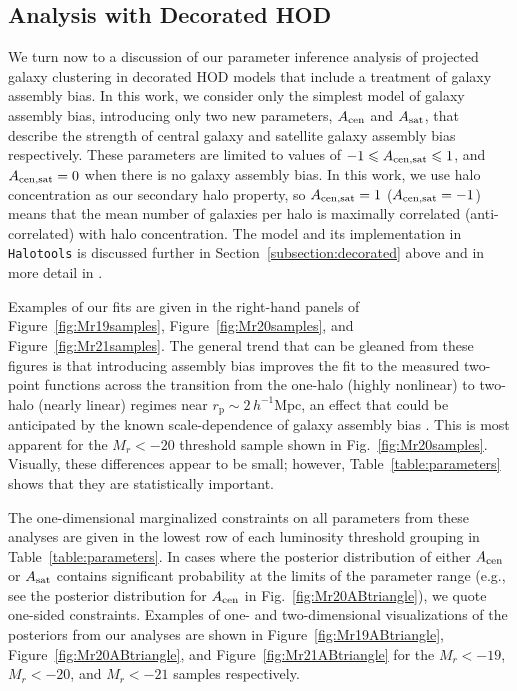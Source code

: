 \documentclass[usenatbib,usegraphicx,letterpaper]{mn2e}
\newcommand{\rp}{r_{\mathrm{p}}}
\begin{document}
\subsection{Analysis with Decorated HOD}
\label{subsection:ab}


We turn now to a discussion of our parameter inference analysis of projected galaxy clustering
in decorated HOD models that include a treatment of galaxy assembly bias. In this work,
we consider only the simplest model of galaxy assembly bias, introducing only two new
parameters, $A_{\rm cen}$ and $A_{\rm sat}$, that describe the strength of central galaxy
and satellite galaxy assembly bias respectively. These parameters are limited to values
of $-1 \le A_{\rm cen,sat} \le 1$, and $A_{\rm cen,sat}=0$ when there is no galaxy assembly bias.
In this work, we use halo concentration as our secondary halo property, so $A_{\rm cen,sat}=1$
($A_{\rm cen,sat}=-1$) means that the mean number of galaxies per halo is maximally
correlated (anti-correlated) with halo concentration. The model and its implementation
in {\tt Halotools} is discussed further in Section~\ref{subsection:decorated} above 
and in more detail in \citet{hearin_etal16}.


Examples of our fits are given in the right-hand panels of Figure~\ref{fig:Mr19samples},
Figure~\ref{fig:Mr20samples}, and Figure~\ref{fig:Mr21samples}. The general trend that
can be gleaned from these figures is that introducing assembly bias improves the fit to
the measured two-point functions across the
transition from the one-halo (highly nonlinear) to two-halo (nearly linear) regimes near 
$\rp \sim 2\, h^{-1}{\mathrm{Mpc}}$, an effect that could be anticipated by the known 
scale-dependence of galaxy assembly bias \citep{sunayama_etal16}. 
This is most apparent for the $M_r < -20$ threshold sample shown in Fig.~\ref{fig:Mr20samples}.
Visually, these differences appear to be small; however, Table~\ref{table:parameters} shows that
they are statistically important.


The one-dimensional marginalized constraints on all parameters from
these analyses are given in the lowest row of each luminosity
threshold grouping in Table~\ref{table:parameters}.  In cases where
the posterior distribution of either $A_{\rm cen}$ or $A_{\rm sat}$ contains significant 
probability at the limits of the parameter range (e.g., see the posterior distribution for
$A_{\rm cen}$ in Fig.~\ref{fig:Mr20ABtriangle}), we quote one-sided 
constraints.  Examples of one- and
two-dimensional visualizations of the posteriors from our analyses are
shown in Figure~\ref{fig:Mr19ABtriangle},
Figure~\ref{fig:Mr20ABtriangle}, and Figure~\ref{fig:Mr21ABtriangle}
for the $M_r<-19$, $M_r<-20$, and $M_r<-21$ samples respectively.
\end{document}
